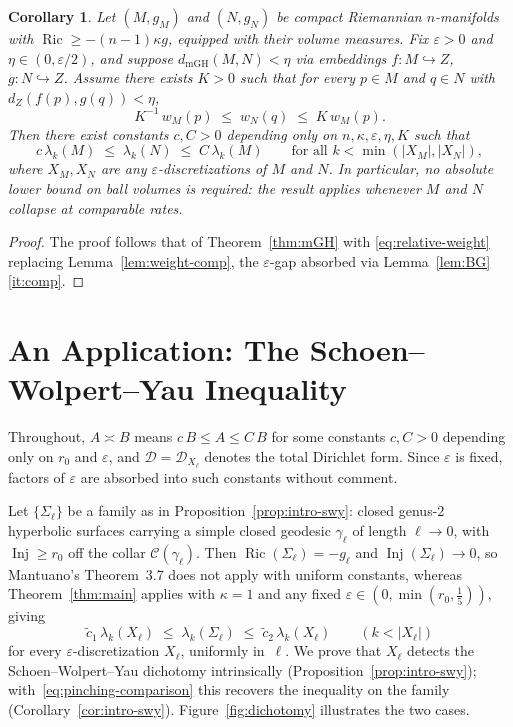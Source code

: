 \documentclass[10pt,reqno]{amsart}
\newtheorem{corollary}[theorem]{Corollary}
\theoremstyle{remark}
\newcommand{\Ric}{\operatorname{Ric}}
\newcommand{\Inj}{\operatorname{Inj}}
\newcommand{\DD}{\mathcal{D}}
\begin{document}
\begin{corollary}
\label{cor:relative-noncollapsing}
Let $(M,g_M)$ and $(N,g_N)$ be compact Riemannian $n$-manifolds with
$\Ric\geq-(n-1)\kappa g$, equipped with their volume measures.
Fix $\varepsilon>0$ and $\eta\in(0,\varepsilon/2)$, and suppose
$d_{\mathrm{mGH}}(M,N)<\eta$ via embeddings $f:M\hookrightarrow Z$,
$g:N\hookrightarrow Z$. Assume there exists $K>0$ such that for every
$p\in M$ and $q\in N$ with $d_Z(f(p),g(q))<\eta$,
\begin{equation}
\label{eq:relative-weight}
  K^{-1}\,w_M(p)\;\leq\;w_N(q)\;\leq\;K\,w_M(p).
\end{equation}
Then there exist constants $c,C>0$ depending only on
$n,\kappa,\varepsilon,\eta,K$ such that
\[
  c\,\lambda_k(M)\;\leq\;\lambda_k(N)\;\leq\;C\,\lambda_k(M)
  \qquad\text{for all }k<\min(|X_M|,|X_N|),
\]
where $X_M,X_N$ are any $\varepsilon$-discretizations of $M$ and $N$.
In particular, no absolute lower bound on ball volumes is required:
the result applies whenever $M$ and $N$ collapse at comparable rates.
\end{corollary}
\begin{proof}
The proof follows that of Theorem~\ref{thm:mGH} with
\eqref{eq:relative-weight} replacing Lemma~\ref{lem:weight-comp},
the $\varepsilon$-gap absorbed via Lemma~\ref{lem:BG}\ref{it:comp}.
\end{proof}
\section{An Application: The Schoen--Wolpert--Yau Inequality}
\label{sec:examples}

Throughout, $A\asymp B$ means $c\,B\le A\le C\,B$ for some constants
$c,C>0$ depending only on $r_0$ and $\varepsilon$, and
$\DD=\DD_{X_\ell}$ denotes the total Dirichlet form. Since
$\varepsilon$ is fixed, factors of $\varepsilon$ are absorbed into such
constants without comment.

Let $\{\Sigma_\ell\}$ be a family as in
Proposition~\ref{prop:intro-swy}: closed genus-$2$ hyperbolic surfaces
carrying a simple closed geodesic $\gamma_\ell$ of length $\ell\to0$,
with $\Inj\ge r_0$ off the collar $\mathcal C(\gamma_\ell)$. Then
$\Ric(\Sigma_\ell)=-g_\ell$ and $\Inj(\Sigma_\ell)\to0$, so Mantuano's
Theorem~3.7 does not apply with uniform constants, whereas
Theorem~\ref{thm:main} applies with $\kappa=1$ and any fixed
$\varepsilon\in(0,\min(r_0,\tfrac15))$, giving
\begin{equation}
\label{eq:pinching-comparison}
  \tilde c_1\,\lambda_k(X_\ell)\;\le\;\lambda_k(\Sigma_\ell)
  \;\le\;\tilde c_2\,\lambda_k(X_\ell)\qquad(k<|X_\ell|)
\end{equation}
for every $\varepsilon$-discretization $X_\ell$, uniformly in~$\ell$.
We prove that $X_\ell$ detects the Schoen--Wolpert--Yau dichotomy
intrinsically (Proposition~\ref{prop:intro-swy});
with~\eqref{eq:pinching-comparison} this recovers the inequality on
the family (Corollary~\ref{cor:intro-swy}). Figure~\ref{fig:dichotomy}
illustrates the two cases.
\end{document}
